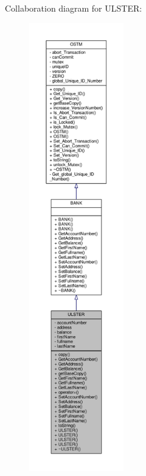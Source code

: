 Collaboration diagram for U\+L\+S\+T\+ER\+:\nopagebreak
\begin{figure}[H]
\begin{center}
\leavevmode
\includegraphics[height=550pt]{class_u_l_s_t_e_r__coll__graph}
\end{center}
\end{figure}
